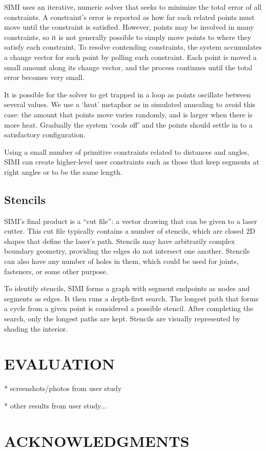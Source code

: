 \documentclass{article}
\begin{document}
SIMI uses an iterative, numeric solver that seeks to minimize the
total error of all constraints. A constraint's error is reported as
how far each related points must move until the constraint is
satisfied. However, points may be involved in many constraints, so it
is not generally possible to simply move points to where they satisfy
each constraint. To resolve contending constraints, the system
accumulates a change vector for each point by polling each
constraint. Each point is moved a small amount along its change
vector, and the process continues until the total error becomes very
small.

It is possible for the solver to get trapped in a loop as points
oscillate between several values. We use a `heat' metaphor as in
simulated annealing to avoid this case: the amount that points move
varies randomly, and is larger when there is more heat. Gradually the
system `cools off' and the points should settle in to a satisfactory
configuration.

Using a small number of primitive constraints related to distances and
angles, SIMI can create higher-level user constraints such as those
that keep segments at right angles or to be the same length.

\subsection{Stencils}

SIMI's final product is a ``cut file'': a vector drawing that can be
given to a laser cutter. This cut file typically contains a number of
stencils, which are closed 2D shapes that define the laser's
path. Stencils may have arbitrarily complex boundary geometry,
providing the edges do not intersect one another. Stencils can also
have any number of holes in them, which could be used for joints,
fasteners, or some other purpose.

To identify stencils, SIMI forms a graph with segment endpoints as
nodes and segments as edges. It then runs a depth-first search. The
longest path that forms a cycle from a given point is considered a
possible stencil. After completing the search, only the longest paths
are kept. Stencils are visually represented by shading the
interior. 

\section{EVALUATION}

* screenshots/photos from user study

* other results from user study...

\section{ACKNOWLEDGMENTS}



\end{document}
